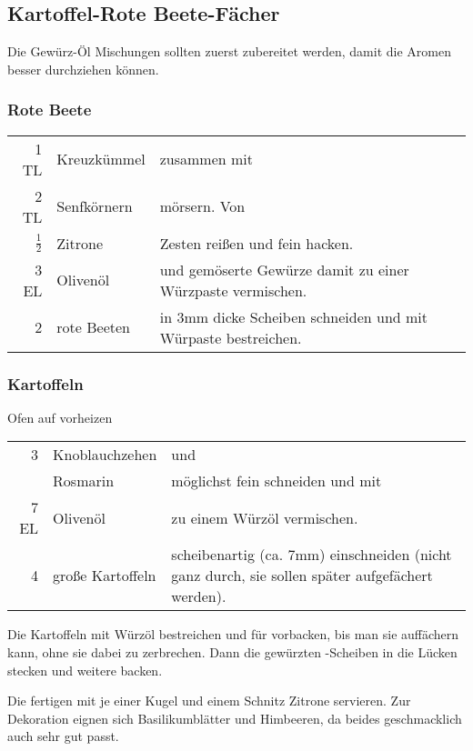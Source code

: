 \subsection*{Kartoffel-Rote Beete-Fächer}\label{subsec:bumblebeets}
Die Gewürz-Öl Mischungen sollten zuerst zubereitet werden, damit die Aromen besser durchziehen können.
\subsubsection*{Rote Beete}\label{subsubsec:beets}
\begin{longtable}{rlL{16.9cm}}
    1 TL            &   Kreuzkümmel &   zusammen mit    \\
    2 TL            &   Senfkörnern &   mörsern. Von    \\
    $\frac{1}{2}$   &   Zitrone     &   Zesten reißen und fein hacken.  \\
    3 EL            &   Olivenöl    &   und gemöserte Gewürze damit zu einer Würzpaste vermischen.  \\
    2               &   rote Beeten &   in 3mm dicke Scheiben schneiden und mit Würpaste bestreichen.\\
\end{longtable}

\subsubsection*{Kartoffeln}
Ofen auf  vorheizen
\begin{longtable}{rlL{16.8cm}}
    3       &   Knoblauchzehen      &   und \\
            &   Rosmarin            &   möglichst fein schneiden und mit    \\
    7 EL    &   Olivenöl            &   zu einem Würzöl vermischen. \\
    4       &   große Kartoffeln    &   scheibenartig (ca. 7mm) einschneiden (nicht ganz durch, sie sollen später aufgefächert werden). \\
\end{longtable}
Die Kartoffeln mit Würzöl bestreichen und für  vorbacken, bis man sie auffächern kann, ohne sie dabei zu zerbrechen.
Dann die gewürzten -Scheiben in die Lücken stecken und weitere  backen.

Die fertigen  mit je einer Kugel  und einem Schnitz Zitrone servieren.
Zur Dekoration eignen sich Basilikumblätter und Himbeeren, da beides geschmacklich auch sehr gut passt.
